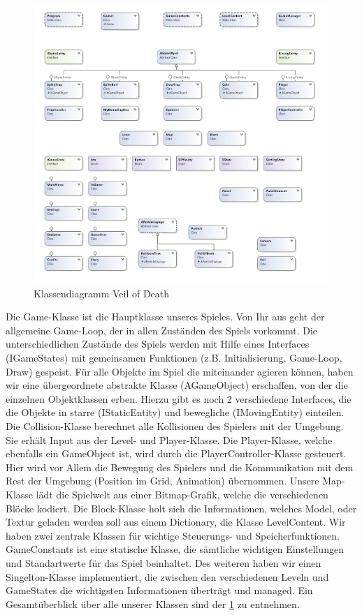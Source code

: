 \documentclass{article}
\begin{document}
\begin{figure}
	\centering
	\includegraphics[width=1\textwidth]{classdiagramm.png}
	\caption{Klassendiagramm Veil of Death
		\label{fig:classdiagramm}}
\end{figure}

Die Game-Klasse ist die Hauptklasse unseres Spieles. Von Ihr aus geht der allgemeine Game-Loop, der in allen Zuständen des Spiels vorkommt. Die unterschiedlichen Zustände des Spiels werden mit Hilfe eines Interfaces (IGameStates) mit gemeinsamen Funktionen (z.B. Initialisierung, Game-Loop, Draw) gespeist.
Für alle Objekte im Spiel die miteinander agieren können, haben wir eine übergeordnete abstrakte Klasse (AGameObject) erschaffen, von der die einzelnen Objektklassen erben.
Hierzu gibt es noch 2 verschiedene Interfaces, die die Objekte in starre (IStaticEntity) und bewegliche (IMovingEntity) einteilen.
Die Collision-Klasse berechnet alle Kollisionen des Spielers mit der Umgebung. Sie erhält Input
aus der Level- und Player-Klasse.
Die Player-Klasse, welche ebenfalls ein GameObject ist, wird durch die PlayerController-Klasse
gesteuert. Hier wird vor Allem die Bewegung des Spielers und die Kommunikation mit dem Rest der Umgebung (Position im Grid, Animation) übernommen.
Unsere Map-Klasse lädt die Spielwelt aus einer Bitmap-Grafik, welche die verschiedenen Blöcke kodiert.
Die Block-Klasse holt sich die Informationen, welches Model, oder Textur geladen werden soll aus einem Dictionary, die Klasse LevelContent.
Wir haben zwei zentrale Klassen für wichtige Steuerungs- und Speicherfunktionen. GameConstants ist eine statische Klasse, die sämtliche wichtigen Einstellungen und Standartwerte für das Spiel beinhaltet. Des weiteren haben wir einen Singelton-Klasse implementiert, die zwischen den verschiedenen Leveln und GameStates die wichtigsten Informationen überträgt und managed.
Ein Gesamtüberblick über alle unserer Klassen sind der \ref{fig:classdiagramm} zu entnehmen.
\end{document}
